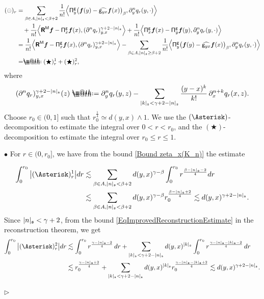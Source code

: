 \documentclass[10pt, reqno]{amsart}
\makeatletter
\numberwithin{subsection}{section}
\numberwithin{subsubsection}{subsection}
\numberwithin{equation}{section} %
\newenvironment{Dem}[1][\unskip]{%
    \begin{list}{\hspace{1.15cm}{\sf \textbf{{\small Proof #1 --}}}}{%
        \setlength{\topsep}{0pt}%
        \setlength{\leftmargin}{0pt}%
        \setlength{\rightmargin}{0pt}%
        \setlength{\listparindent}{0pt}%
        \setlength{\itemindent}{0pt}%
        \setlength{\parsep}{0pt}%
        \addtolength{\leftmargin}{0pt}%
        \addtolength{\rightmargin}{0pt}%
    } \item }{\hfill $\rhd$\end{list}\smallskip}
\theoremstyle{mystyle}
\theoremstyle{mystyle2}
\theoremstyle{mystyle3}
\newcommand{\bsf}{\boldsymbol{f}}
\newcommand*{\defeq}{\mathrel{\rlap{%
                     \raisebox{0.3ex}{$\m@th\cdot$}}%
                     \raisebox{-0.3ex}{$\m@th\cdot$}}%
                     =}
\newcommand*{\eqdef}{=\mathrel{\rlap{%
                     \raisebox{0.3ex}{$\m@th\cdot$}}%
                     \raisebox{-0.3ex}{$\m@th\cdot$}}%
                     }
\makeatother
\begin{document}
\begin{Dem}[of Theorem \ref{thm wellposedness of K}]
{\begin{align*}
(\circleddash)_r &= \sum_{\beta\in A, |n|_{\frak{s}}<\beta+2}
\frac1{n!} \Big\langle {\sf\Pi}^{\sf g}_y \big(\bsf(y) - \widehat{{\sf g}_{yx}}\bsf(x)\big)_\beta, \partial_y^n q_r(y,\cdot) \Big\rangle  \\
&\quad+ 
\frac1{n!} \Big\langle \textbf{\textsf{R}}^{\sf M}\bsf - {\sf\Pi}_x^{\sf g}\bsf(x) , (\partial^n q_r)_{y,x}^{\gamma+2-|n|_{\frak{s}}} \Big\rangle
+ \frac1{n!} \Big\langle {\sf\Pi}^{\sf g}_x \bsf(x) - {\sf\Pi}^{\sf g}_y\bsf(y) , \partial_y^n q_r(y,\cdot) \Big\rangle\\
&=
\frac1{n!} \Big\langle \textbf{\textsf{R}}^{\sf M}\bsf - {\sf\Pi}_x^{\sf g}\bsf(x) , (\partial^n q_r)_{y,x}^{\gamma+2-|n|_{\frak{s}}} \Big\rangle  
-\sum_{\beta\in A, |n|_{\frak{s}}\ge\beta+2} \frac1{n!} \Big\langle {\sf\Pi}^{\sf g}_y \big(\bsf(y) - \widehat{{\sf g}_{yx}}\bsf(x)\big)_\beta, \partial_y^n q_r(y,\cdot) \Big\rangle
\\
&\eqdef (\bigstar)_r^1+(\bigstar)_r^2,
\end{align*}
where
\begin{align*}
(\partial^n q_r)_{y,x}^{\gamma+2-|n|_{\frak{s}}}(z) \defeq  \partial_y^n q_r(y,z) - \sum_{|k|_{\frak{s}} < \gamma+2-|n|_{\frak{s}}}\frac{(y-x)^k}{k!}\,\partial_x^{n+k}q_r(x,z).
\end{align*}
Choose $r_0\in(0,1]$ such that $r_0^{\frac1{4}}\simeq d(y,x)\wedge1$. We use the $(\Asterisk)$-decomposition to estimate the integral over $0<r<r_0$, and the $(\bigstar)$-decomposition to estimate the integral over $r_0\le r\leq 1$.   \vspace{0.15cm} 

$\bullet$ For $r\in(0,r_0]$, we have from the bound \eqref{Bound zeta_x(K_n)} the estimate 

\begin{align*}
\int_0^{r_0} \big|(\Asterisk)^1_r\big| dr
&\lesssim \sum_{\beta\in A,|n|_{\frak{s}}<\beta+2} d(y,x)^{\gamma-\beta}
\int_0^{r_0}r^{\frac{\beta-|n|_{\frak{s}}-2}{4}} dr   \\
&\lesssim \sum_{\beta\in A,|n|_{\frak{s}}<\beta+2} d(y,x)^{\gamma-\beta} r_0^{\frac{\beta-|n|_{\frak{s}}+2}{4}}
\lesssim d(y,x)^{\gamma+2-|n|_{\frak{s}}}.
\end{align*}
Since $|n|_{\frak{s}}<\gamma+2$, from the bound  \eqref{EqImprovedReconstructionEstimate} in the reconstruction theorem, we get
\begin{align*}
\int_0^{r_0} \big|(\Asterisk)^2_r\big| dr
&\lesssim \int_0^{r_0} r^{\frac{\gamma-|n|_{\frak{s}}-2}{4}}\,dr
+ \sum_{|k|_{\frak{s}}<\gamma+2-|n|_{\frak{s}}} d(y,x)^{|k|_{\frak{s}}}
\int_0^{r_0} r^{\frac{\gamma-|n|_{\frak{s}}-|k|_{\frak{s}}-2}{4}}\,dr\\
&\lesssim r_0^{\frac{\gamma-|n|_{\frak{s}}+2}{4}}
+ \sum_{|k|_{\frak{s}}<\gamma+2-|n|_{\frak{s}}} d(y,x)^{|k|_{\frak{s}}}
r_0^{\frac{\gamma-|n|_{\frak{s}}-|k|_{\frak{s}}+2}{4}}
\lesssim  d(y,x)^{\gamma+2-|n|_{\frak{s}}}.
\end{align*}

}
\end{Dem}
\end{document}
